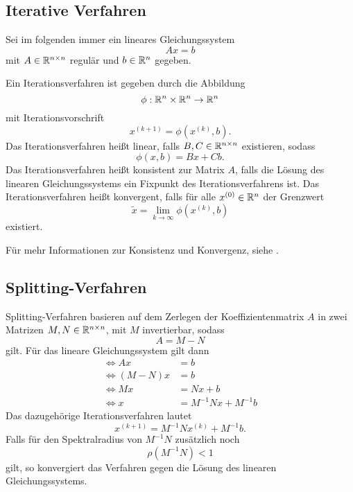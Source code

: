 \documentclass{scrartcl}
\begin{document}
\subsection{Iterative Verfahren}

Sei im folgenden immer ein lineares Gleichungssystem
\[Ax=b\]
mit \(A \in \mathbb{R}^{n \times n}\) regulär und \(b \in \mathbb{R}^n\) gegeben.
\begin{definition}\cite[p.~69-70]{Iterative}
    Ein Iterationsverfahren ist gegeben durch die Abbildung
    \[\phi:\mathbb{R}^n \times \mathbb{R}^n \rightarrow \mathbb{R}^n\]
    mit Iterationsvorschrift
    \[x^{(k+1)}=\phi(x^{(k)},b).\]
    Das Iterationsverfahren heißt linear, falls \(B,C \in \mathbb{R}^{n \times n}\)
    existieren, sodass
    \[\phi(x,b)=Bx+Cb.\]
    Das Iterationsverfahren heißt konsistent zur Matrix \(A\), falls die Lösung
    des linearen Gleichungssystems ein Fixpunkt des Iterationsverfahrens ist.
    Das Iterationsverfahren heißt konvergent, falls für alle \(x^{(0)} \in
    \mathbb{R}^n\) der Grenzwert
    \[\tilde{x} = \lim_{k \to \infty} \phi(x^{(k)},b)\] existiert.
\end{definition}
Für mehr Informationen zur Konsistenz und Konvergenz, siehe \cite[p.~71-72]{Iterative}.

\subsection{Splitting-Verfahren}

Splitting-Verfahren basieren auf dem Zerlegen der Koeffizientenmatrix \(A\) in
zwei Matrizen \(M, N \in \mathbb{R}^{n \times n}\), mit \(M\) invertierbar, sodass
\[A = M-N\]
gilt. Für das lineare Gleichungssystem gilt dann
\begin{align*}
    \iff Ax     & = b                  \\
    \iff (M-N)x & = b                  \\
    \iff Mx     & = Nx + b             \\
    \iff x      & = M^{-1}Nx + M^{-1}b
\end{align*}
Das dazugehörige Iterationsverfahren lautet\cite[p.~165]{SOR}
\[x^{(k+1)}= M^{-1}Nx^{(k)} + M^{-1}b.\]
Falls für den Spektralradius von \(M^{-1}N\) zusätzlich noch
\[\rho(M^{-1}N)<1\]
gilt, so konvergiert das Verfahren gegen die Lösung des linearen
  Gleichungssystems\cite[p.~73-74]{Iterative}.
\end{document}
